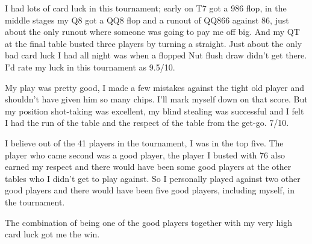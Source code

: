 I had lots of card luck in this tournament; early on T7 got a 986 flop,
in the middle stages my Q8 got a QQ8 flop and a runout of QQ866 against
86, just about the only runout where someone was going to pay me off big.
And my QT at the final table busted three players by turning a straight.
Just about the only bad card luck I had all night was when a flopped
Nut flush draw didn't get there. I'd rate my luck in this tournament
as 9.5/10.

My play was pretty good, I made a few mistakes against the tight old
player and shouldn't have given him so many chips. I'll mark myself
down on that score. But my position shot-taking was excellent, my blind
stealing was successful and I felt I had the run of the table and
the respect of the table from the get-go. 7/10.

I believe out of the 41 players in the tournament, I was in the
top five. The player who came second was a good player, the player
I busted with 76 also earned my respect and there would have been
some good players at the other tables who I didn't get to play
against. So I personally played against two other good players
and there would have been five good players, including myself,
in the tournament.

The combination of being one of the good players together
with my very high card luck got me the win.
